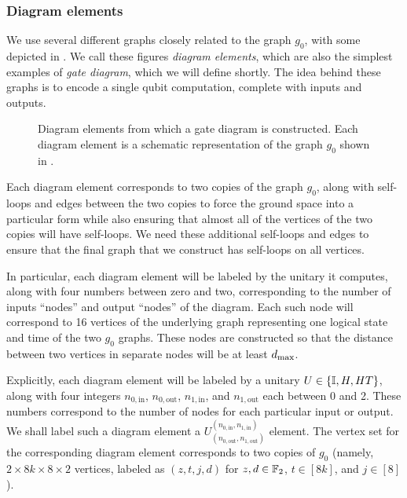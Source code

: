 \documentclass[../thesis-main/thesis-main]{subfiles}
\begin{document}
\subsubsection{Diagram elements}\label{sec:diagram_elements}

We use several different graphs closely related to the graph $g_0$, with some depicted in .  We call these figures \emph{diagram elements}, which are also the simplest examples of \emph{gate diagram}, which we will define shortly.  The idea behind these graphs is to encode a single qubit computation, complete with inputs and outputs. 


\begin{figure}
\centering
\qquad
{} 
\qquad 
{}
\caption{Diagram elements from which a gate diagram is constructed. Each diagram element is a schematic representation of the graph $g_{0}$ shown
in . 
\label{fig:diagram_elements}}
\end{figure}

Each diagram element corresponds to two copies of the graph $g_0$, along with self-loops and edges between the two copies to force the ground space into a particular form while also ensuring that almost all of the vertices of the two copies will have self-loops.  We need these additional self-loops and edges to ensure that the final graph that we construct has self-loops on all vertices. 

In particular, each diagram element will be labeled by the unitary it computes, along with four numbers between zero and two, corresponding to the number of inputs ``nodes'' and output ``nodes'' of the diagram.  Each such node will correspond to 16 vertices of the underlying graph representing one logical state and time of the two $g_0$ graphs.  These nodes are constructed so that the distance between two vertices in separate nodes will be at least $d_{\text{max}}$.  

Explicitly, each diagram element will be labeled by a unitary $U\in \{\mathbb{I}, H, HT\}$, along with four integers $n_{0,\text{in}}$, $n_{0,\text{out}}$, $n_{1,\text{in}}$, and $n_{1,\text{out}}$ each between 0 and 2.  These numbers correspond to the number of nodes for each particular input or output.  We shall label such a diagram element a $U^{(n_{0,\text{in}},n_{1,\text{in}})}_{(n_{0,\text{out}},n_{1,\text{out}})}$ element.  The vertex set for the corresponding diagram element corresponds to two copies of $g_0$ (namely, $2\times 8k \times 8 \times 2$ vertices, labeled as $(z,t,j,d)$ for $z,d\in \mathbb{F}_2$, $t\in [8k]$, and $j\in [8]$).  
\end{document}
